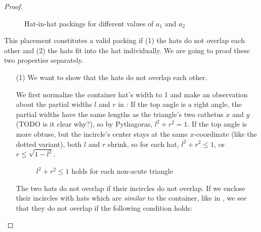\documentclass[a4paper,style=print,bibliography=totoc,nexus,lnum,extramargin]{tubsbook}
\begin{document}
\begin{proof}
\begin{figure}
        \vspace{2mm}


        \caption{Hat-in-hat packings for different values of $a_1$ and $a_2$}
        \label{fig:hatsinhat}
    \end{figure}

    This placement constitutes a valid packing if (1) the hats do not overlap each other and (2) the hats fit into the hat individually. We are going to proof these two properties separately.

    \begin{itemize}
        \item[(1)]
            We want to show that the hats do not overlap each other.

            We first normalize the container hat's width to 1 and make an observation about the partial widths $l$ and $r$ in : If the top angle is a right angle, the partial widths have the same lengths as the triangle's two cathetus $x$ and $y$ (TODO is it clear why?), so by Pythagoras, $l^2 + r^2 = 1$. If the top angle is more obtuse, but the incircle's center stays at the same $x$-coordinate (like the dotted variant), both $l$ and $r$ shrink, so for each hat, $l^2 + r^2 \le 1$, or $r \le \sqrt{1-l^2}$.

            \begin{figure}

                \caption{$l^2 + r^2 \le 1$ holds for each non-acute triangle}
                \label{fig:hatlr}
            \end{figure}

            The two hats do not overlap if their incircles do not overlap. If we enclose their incircles with hats which are \emph{similar} to the container, like in , we see that they do not overlap if the following condition holds:


\end{itemize}
\end{proof}
\end{document}
